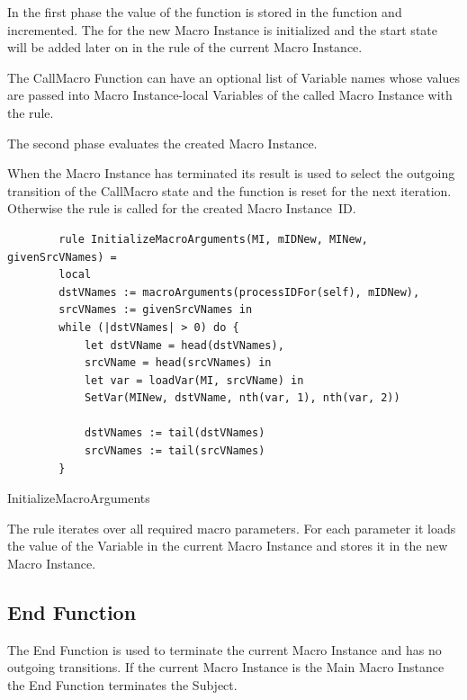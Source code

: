 In the first phase the value of the 
function is stored in the  function and
incremented. The  for the new Macro Instance is
initialized and the start state will be added later on in the
 rule of the current Macro Instance.

The CallMacro Function can have an optional list of Variable names whose values
are passed into Macro Instance-local Variables of the called Macro Instance with
the  rule.

The second phase evaluates the created Macro Instance.

When the Macro Instance has terminated its result is used to select the
outgoing transition of the CallMacro state and the 
function is reset for the next iteration. Otherwise the
 rule is called for the created Macro Instance~ID.

\begin{listing}[H]
	\begin{verbatim}
		rule InitializeMacroArguments(MI, mIDNew, MINew, givenSrcVNames) =
		local
		dstVNames := macroArguments(processIDFor(self), mIDNew),
		srcVNames := givenSrcVNames in
		while (|dstVNames| > 0) do {
			let dstVName = head(dstVNames),
			srcVName = head(srcVNames) in
			let var = loadVar(MI, srcVName) in
			SetVar(MINew, dstVName, nth(var, 1), nth(var, 2))
			
			dstVNames := tail(dstVNames)
			srcVNames := tail(srcVNames)
		}
	\end{verbatim}
	\caption{InitializeMacroArguments}
	\label{lst:shortasm:InitializeMacroArguments}
\end{listing}

The  rule iterates over all required macro
parameters. For each parameter it loads the value of the Variable in the current Macro Instance and stores it in the
new Macro Instance.

\subsection{End Function}

The End Function is used to terminate the current Macro Instance and has no outgoing transitions.
If the current Macro Instance is the Main Macro Instance the End Function terminates the Subject.

